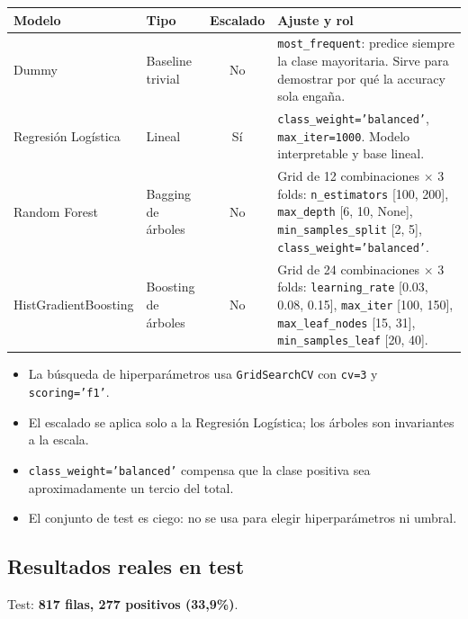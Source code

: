 \documentclass[11pt,a4paper]{article}
\newcommand{\code}[1]{\texttt{#1}}
\begin{document}
\begin{table}[H]
\centering
\small
\begin{tabularx}{\textwidth}{@{}L{3.6cm} L{2.4cm} c Y@{}}
\toprule
\textbf{Modelo} & \textbf{Tipo} & \textbf{Escalado} & \textbf{Ajuste y rol} \\
\midrule
Dummy & Baseline trivial & No &
\code{most_frequent}: predice siempre la clase mayoritaria. Sirve para demostrar por qué la accuracy sola engaña. \\
Regresión Logística & Lineal & Sí &
\code{class_weight='balanced'}, \code{max_iter=1000}. Modelo interpretable y base lineal. \\
Random Forest & Bagging de árboles & No &
Grid de 12 combinaciones $\times$ 3 folds: \code{n_estimators} [100, 200], \code{max_depth} [6, 10, None], \code{min_samples_split} [2, 5], \code{class_weight='balanced'}. \\
HistGradientBoosting & Boosting de árboles & No &
Grid de 24 combinaciones $\times$ 3 folds: \code{learning_rate} [0.03, 0.08, 0.15], \code{max_iter} [100, 150], \code{max_leaf_nodes} [15, 31], \code{min_samples_leaf} [20, 40]. \\
\bottomrule
\end{tabularx}
\end{table}

\begin{itemize}[leftmargin=*]
  \item La búsqueda de hiperparámetros usa \code{GridSearchCV} con \code{cv=3} y \code{scoring='f1'}.
  \item El escalado se aplica solo a la Regresión Logística; los árboles son invariantes a la escala.
  \item \code{class_weight='balanced'} compensa que la clase positiva sea aproximadamente un tercio del total.
  \item El conjunto de test es ciego: no se usa para elegir hiperparámetros ni umbral.
\end{itemize}

\subsection{Resultados reales en test}

Test: \textbf{817 filas, 277 positivos (33,9\%)}.
\end{document}
